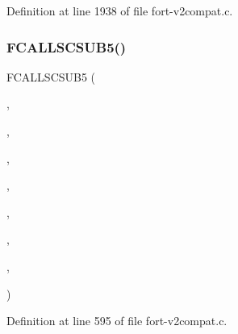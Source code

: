 Definition at line 1938 of file fort-\/v2compat.\+c.

\mbox{\label{fort-v2compat_8c_a12ee5114ed329211614492afea1a67a9}} 
\subsubsection{\texorpdfstring{F\+C\+A\+L\+L\+S\+C\+S\+U\+B5()}{FCALLSCSUB5()}\hspace{0.1cm}{\footnotesize\ttfamily [1/8]}}
{\footnotesize\ttfamily F\+C\+A\+L\+L\+S\+C\+S\+U\+B5 (\begin{DoxyParamCaption}\item[{\hyperlink{nf__v2compat_8c_a9bb20b1a81299cccacc6a3116f17b55a}{c\+\_\+ncdinq}}]{,  }\item[{N\+C\+D\+I\+NQ}]{,  }\item[{\hyperlink{nf__fortv2_8f90_a6ee036c798e7436b1d962c7dfc8a6957}{ncdinq}}]{,  }\item[{N\+C\+ID}]{,  }\item[{\hyperlink{ncfortran_8h_affac6052df8e434d04708ecc3986d215}{D\+I\+M\+ID}}]{,  }\item[{P\+S\+T\+R\+I\+NG}]{,  }\item[{\hyperlink{fort-v2compat_8c_a966419668dc6e6f3e34bc743e56397a6}{P\+D\+I\+M\+L\+EN}}]{,  }\item[{\hyperlink{fort-v2compat_8c_ae2352f39cbd25bcaf1bedbbb12db73fe}{P\+R\+C\+O\+DE}}]{ }\end{DoxyParamCaption})}



Definition at line 595 of file fort-\/v2compat.\+c.

\mbox{\label{fort-v2compat_8c_a682aab2eac9878efe2fa07d8c24ac6f0}} 
